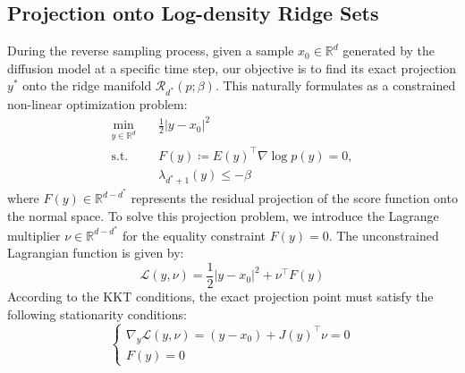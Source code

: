 \documentclass[11pt]{article}
\begin{document}
\subsection{Projection onto Log-density Ridge Sets} \label{app:newton_distance}
During the reverse sampling process, given a sample $x_0 \in \mathbb{R}^d$ generated by the diffusion model at a specific time step, our objective is to find its exact projection $y^*$ onto the ridge manifold $\mathcal{R}_{d^*}(p;\beta)$. This naturally formulates as a constrained non-linear optimization problem:
\begin{equation}
\begin{aligned}
\min_{y \in \mathbb{R}^d} \quad & \frac{1}{2} | y - x_0 |^2 \\
\text{s.t.} \quad & F(y) \coloneqq E(y)^\intercal \nabla \log p(y) = 0, \\
& \lambda_{d^*+1}(y) \le -\beta
\end{aligned}
\end{equation}
where $F(y) \in \mathbb{R}^{d-d^*}$ represents the residual projection of the score function onto the normal space. To solve this projection problem, we introduce the Lagrange multiplier $\nu \in \mathbb{R}^{d-d^*}$ for the equality constraint $F(y)=0$. The unconstrained Lagrangian function is given by:
\begin{equation}
\mathcal{L}(y, \nu) = \frac{1}{2} | y - x_0 |^2 + \nu^\intercal F(y)
\end{equation}
According to the KKT conditions, the exact projection point must satisfy the following stationarity conditions:
\begin{equation}
\begin{cases}
\nabla_y \mathcal{L}(y, \nu) = (y - x_0) + J(y)^\intercal \nu = 0 \\
F(y) = 0
\end{cases}
\end{equation}
\end{document}
